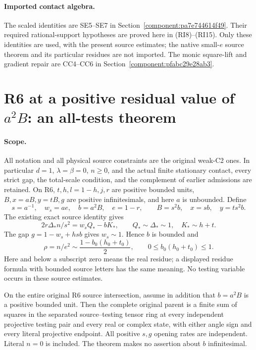 \paragraph{Imported contact algebra.}
The scaled identities are SE5--SE7 in
Section~\ref{component:pa7e744614f49}. Their required rational-support
hypotheses are proved here in (RI8)--(RI15). Only these identities are
used, with the present source estimates; the native small-$e$ source
theorem and its particular residues are not imported. The monic
square-lift and gradient repair are CC4--CC6 in
Section~\ref{component:pfabc29e28ab3}.


\section{\texorpdfstring{R6 at a positive residual value of $a^2B$: an all-tests theorem}{R6 at a positive residual value of a2B: an all-tests theorem}}
\label{component:pb60eba754641}

\label{pb60eba754641:sec:r6-b-unit}

\paragraph{Scope.}
All notation and all physical source constraints are the original weak-C2
ones. In particular $d=1$, $\lambda=\beta=0$, $n\geq0$, and the actual
finite stationary contact, every strict gap, the total-scale condition,
and the complement of earlier admissions are retained. On R6,
$t,h,l=1-h,j,r$ are positive bounded units, $B,x=aB,y=tB,g$ are
positive infinitesimals, and here $a$ is unbounded. Define
\[
 s=a^{-1},\quad w_s=ae,\quad b=a^2B,\quad e=1-r,
 \qquad B=s^2b,\quad x=sb,\quad y=ts^2b.
 \tag{RB1}
\]
The existing exact source identity gives
\[
 2r\Delta_*n/s^2=w_sQ_*-bK_*,\qquad
 Q_*\sim\Delta_*\sim1,\quad K_*\sim h+t.
 \tag{RB2}
\]
The gap $g=1-w_s+hsb$ gives $w_s\sim1$. Hence $b$ is bounded and
\[
 \rho=n/e^2\sim\frac{1-b_0(h_0+t_0)}2,\qquad
 0\leq b_0(h_0+t_0)\leq1.                         \tag{RB3}
\]
Here and below a subscript zero means the real residue; a displayed
residue formula with bounded source letters has the same meaning.
No testing variable occurs in these source estimates.

\begin{theorem}
On the entire original R6 source intersection, assume in addition that
$b=a^2B$ is a positive bounded unit. Then the complete original parent
is a finite sum of squares in the separated source--testing tensor ring
at every independent projective testing pair and every real or complex
state, with either angle sign and every literal projective endpoint.
All positive $s,g$ opening rates are independent. Literal $n=0$ is
included. The theorem makes no assertion about $b$ infinitesimal.
\end{theorem}

